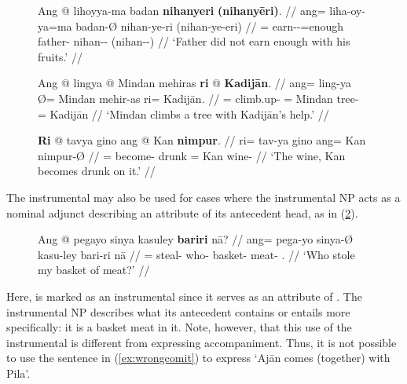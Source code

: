 \begin{figure}
\pex\label{ex:insmarking}
%
\a\begingl
	\gla Ang @ lihoyya-ma badan \textbf{nihanyeri} 
		\textbf{\textup{(}nihanyēri\textup{)}}. //
	\glb ang= liha-oy-ya=ma badan-Ø nihan-ye-ri (nihan-ye-eri) //
	\glc \AgtT{}= earn-\Neg{}-\TsgM{}=enough father-\Top{} 
		nihan-\Pl{}-\Ins{} (nihan-\Pl{}-\Ins) //
	\glft `Father did not earn enough with his fruits.' //
\endgl

\a\begingl
	\gla Ang @ lingya {} @ Mindan mehiras \textbf{ri} @ \textbf{Kadijān}. //
	\glb ang= ling-ya Ø= Mindan mehir-as ri= Kadijān. //
	\glc \AgtT{}= climb.up-\TsgM{} \Top{}= Mindan tree-\Parg{} 
		\Ins{}= Kadijān //
	\glft `Mindan climbs a tree with Kadijān's help.' //
\endgl

\a\begingl
	\gla \textbf{Ri} @ tavya gino ang @ Kan \textbf{nimpur}. //
	\glb ri= tav-ya gino ang= Kan nimpur-Ø //
	\glc \InsT{}= become-\TsgM{} drunk \Aarg{}= Kan wine-\Top{} //
	\glft `The wine, Kan becomes drunk on it.' //
\endgl
\xe
\end{figure}

The instrumental may also be used for cases where the instrumental NP acts as a
nominal adjunct describing an attribute of its antecedent head, as in
(\ref{ex:nounadjc}).

\begin{figure}[h]
\ex\label{ex:nounadjc}
\begingl
	\gla Ang @ pegayo sinya kasuley \textbf{bariri} nā? //
	\glb ang= pega-yo sinya-Ø kasu-ley bari-ri nā //
	\glc \AgtT{}= steal-\TsgN{} who-\Top{} basket-\PargI{} 
		meat-\Ins{} \Fsg{}.\Gen{} //
	\glft `Who stole my basket of meat?' //
\endgl\xe
\end{figure}

Here,  is marked as an instrumental since it serves as an
attribute of . The instrumental NP describes what its
antecedent contains or entails more specifically: it is a basket  meat
in it. Note, however, that this use of the instrumental is different from
expressing accompaniment. Thus, it is not possible to use the sentence in
(\ref{ex:wrongcomit}) to express `Ajān comes (together) with Pila'.

